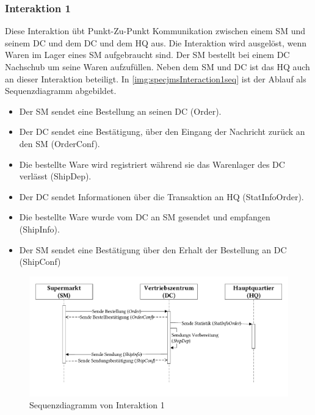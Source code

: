 \subsubsection{Interaktion 1}
\label{sec:interaction1desc}
Diese Interaktion übt Punkt-Zu-Punkt Kommunikation zwischen einem SM und seinem DC und dem DC und dem HQ aus. Die Interaktion wird ausgelöst, wenn Waren im Lager eines SM aufgebraucht sind. Der SM bestellt bei einem DC Nachschub um seine Waren aufzufüllen. Neben dem SM und DC ist das HQ auch an dieser Interaktion beteiligt. In \autoref{img:specjmsInteraction1seq} ist der Ablauf als Sequenzdiagramm abgebildet. 
\begin{itemize}
    \item Der SM sendet eine Bestellung an seinen DC (Order).
    \item Der DC sendet eine Bestätigung, über den Eingang der Nachricht zurück an den SM (OrderConf).
    \item Die bestellte Ware wird registriert während sie das Warenlager des DC verlässt (ShipDep).
    \item Der DC sendet Informationen über die Transaktion an HQ (StatInfoOrder).
    \item Die bestellte Ware wurde vom DC an SM gesendet und empfangen (ShipInfo).
    \item Der SM sendet eine Bestätigung über den Erhalt der Bestellung an DC (ShipConf)
\end{itemize}

\begin{figure}
\center
  \includegraphics[width=1\textwidth]{images/evaluation/specjms/evaluationInteraktion1seq.pdf}
  \caption{Sequenzdiagramm von Interaktion 1}
  \label{img:specjmsInteraction1seq}
\end{figure}

